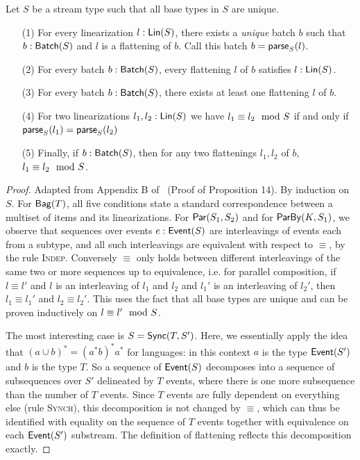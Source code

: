 \begin{proposition}
\label{prop:batch-lin-correspondence}
Let $S$ be a stream type such that all base types in $S$ are unique.
\begin{enumerate}
\item[(1)] For every linearization $\lintype{l}{S}$, there exists a \emph{unique} batch $b$ such that $\batchtype{b}{S}$ and $l$ is a flattening of $b$. Call this batch $b = \parselin{l}{S}$.
\item[(2)] For every batch $\batchtype{b}{S}$, every flattening $l$ of $b$ satisfies $\lintype{l}{S}$.
\item[(3)] For every batch $\batchtype{b}{S}$, there exists at least one flattening $l$ of $b$.
\item[(4)] For two linearizations $\lintype{l_1, l_2}{S}$ we have $\equivtype{l_1}{l_2}{S}$ if and only if $\parselin{l_1}{S} = \parselin{l_2}{S}$
\item[(5)] Finally, if $\batchtype{b}{S}$, then for any two flattenings $l_1, l_2$ of $b$, $\equivtype{l_1}{l_2}{S}$.
\end{enumerate}
\end{proposition}
\begin{proof}
Adapted from Appendix B of~ (Proof of Proposition 14).
By induction on $S$.
For $\relleaf{T}$,
all five conditions state a standard correspondence between a multiset of items and its linearizations.
For $\parcomp{S_1}{S_2}$
and for $\keyby{K}{S_1}$,
we observe that sequences over events $\eventtype{e}{S}$ are interleavings of events each from a subtype,
and all such interleavings are equivalent with respect to $\equiv$, by the rule \textsc{Indep}.
Conversely $\equiv$ only holds between different interleavings of the same two or more sequences up to equivalence, i.e. for parallel composition, if $l \equiv l'$ and $l$ is an interleaving of $l_1$ and $l_2$ and $l_1'$ is an interleaving of $l_2'$, then $l_1 \equiv l_1'$ and $l_2 \equiv l_2'$.
This uses the fact that all base types are unique and can be proven inductively on $\equivtype{l}{l'}{S}$.

The most interesting case is $S = \hier{T}{S'}$.
Here, we essentially apply the idea that $(a \cup b)^{*} = (a^{*} b)^{*} a^{*}$ for languages: in this context $a$ is the type $\event{S'}$ and $b$ is the type $T$.
So a sequence of $\event{S}$ decomposes into a sequence of subsequences over $S'$ delineated by $T$ events, where there is one more subsequence than the number of $T$ events.
Since $T$ events are fully dependent on everything else (rule \textsc{Synch}), this decomposition is not changed by $\equiv$, which can thus be identified with equality on the sequence of $T$ events together with equivalence on each $\event{S'}$ substream.
The definition of flattening reflects this decomposition exactly.
\end{proof}

